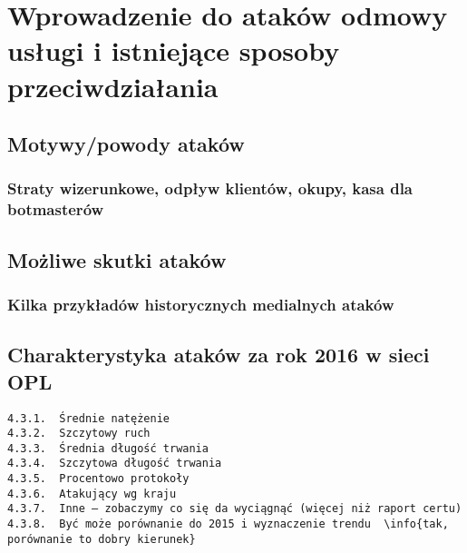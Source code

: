 \chapter{Wprowadzenie do ataków odmowy usługi i istniejące sposoby przeciwdziałania}

 
\section{Motywy/powody ataków}
\subsection{Straty wizerunkowe, odpływ klientów, okupy, kasa dla botmasterów}
\section{Możliwe skutki ataków}
\subsection{Kilka przykładów historycznych medialnych ataków}
\section{Charakterystyka ataków za rok 2016 w sieci OPL}
\begin{verbatim}
4.3.1.	Średnie natężenie
4.3.2.	Szczytowy ruch
4.3.3.	Średnia długość trwania
4.3.4.	Szczytowa długość trwania
4.3.5.	Procentowo protokoły
4.3.6.	Atakujący wg kraju
4.3.7.	Inne – zobaczymy co się da wyciągnąć (więcej niż raport certu)
4.3.8.	Być może porównanie do 2015 i wyznaczenie trendu  \info{tak, porównanie to dobry kierunek}
\end{verbatim}



